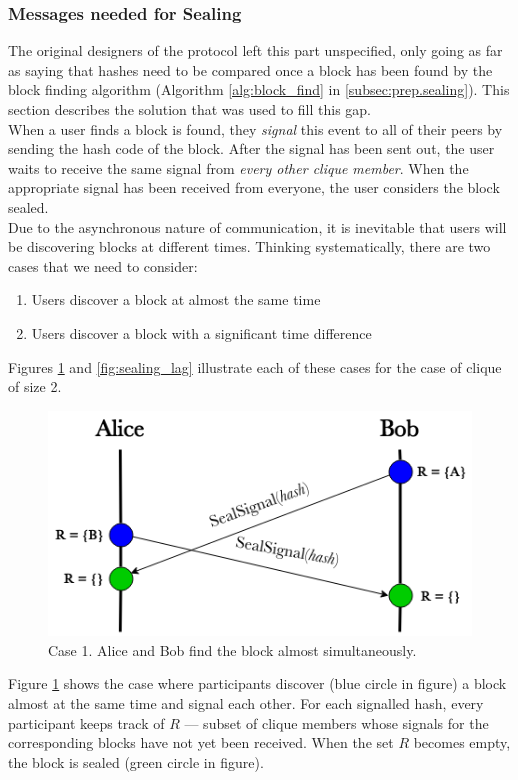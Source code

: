 \documentclass[a4paper, twoside, 12pt]{report}
\begin{document}
\subsubsection{Messages needed for Sealing}
The original designers of the protocol left this part unspecified, only going as far as saying that hashes need to be compared once a block has been found by the block finding algorithm (Algorithm \ref{alg:block_find} in \cref{subsec:prep.sealing}). This section describes the solution that was used to fill this gap. \\

When a user finds a block is found, they \emph{signal} this event to all of their peers by sending the hash code of the block. After the signal has been sent out, the user waits to receive the same signal from \emph{every other clique member}. When the appropriate signal has been received from everyone, the user considers the block sealed. \\

Due to the asynchronous nature of communication, it is inevitable that users will be discovering blocks at different times. Thinking systematically, there are two cases that we need to consider:
\begin{enumerate}
    \item Users discover a block at almost the same time
    \item Users discover a block with a significant time difference
\end{enumerate}
Figures \ref{fig:sealing_simult} and \ref{fig:sealing_lag} illustrate each of these cases for the case of clique of size 2.

\begin{figure}[H]
    \captionsetup{width=0.85\textwidth}
    \centering
    \includegraphics[width=0.6\linewidth]{pics/sealing_simult.png}
    \caption{\label{fig:sealing_simult} Case 1. Alice and Bob find the block almost simultaneously.}
\end{figure}
Figure \ref{fig:sealing_simult} shows the case where participants discover ({\color{blue}blue} circle in figure) a block almost at the same time and signal each other. For each signalled hash, every participant keeps track of $R$ --- subset of clique members whose signals for the corresponding blocks have not yet been received. When the set $R$ becomes empty, the block is sealed ({\color{deepgreen}green} circle in figure).
\end{document}
